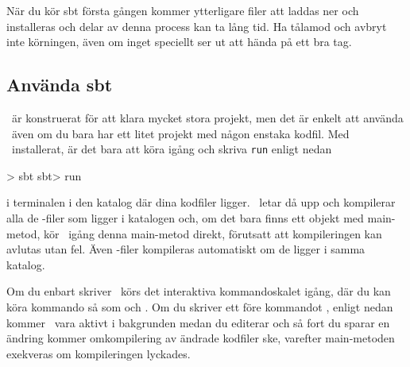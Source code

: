 \noindent När du kör sbt första gången kommer ytterligare filer att laddas ner och installeras och delar av denna process kan ta lång tid. Ha tålamod och avbryt inte körningen, även om inget speciellt ser ut att hända på ett bra tag.

%
%


\subsection{Använda sbt}
\sbt\ är konstruerat för att klara mycket stora projekt, men det är enkelt att använda \sbt\ även om du bara har ett litet projekt med någon enstaka kodfil. Med \sbt\ installerat, är det bara att köra igång \sbt och skriva \texttt{run} enligt nedan
\begin{REPLnonum}
> sbt
sbt> run
\end{REPLnonum}
i terminalen i den katalog där dina kodfiler ligger. \sbt\ letar då upp och kompilerar alla de -filer som ligger i katalogen och, om det bara finns ett objekt med main-metod, kör \sbt\ igång denna main-metod direkt, förutsatt att kompileringen kan avlutas utan fel. Även -filer kompileras automatiskt om de ligger i samma katalog.

Om du enbart skriver \sbt\ körs det interaktiva kommandoskalet igång, där du kan köra kommando så som  och . Om du skriver ett \code{~} före kommandot , enligt nedan kommer \sbt\ vara aktivt i bakgrunden medan du editerar och så fort du sparar en ändring kommer omkompilering av ändrade kodfiler ske, varefter main-metoden exekveras om kompileringen lyckades.

